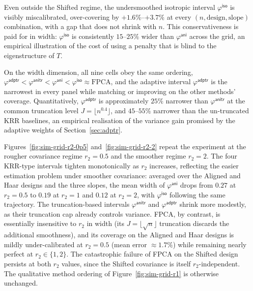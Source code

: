 \documentclass[11pt,a4paper]{article}
\theoremstyle{definition}
\theoremstyle{plain}
\theoremstyle{remark}
\newcommand{\iso}{\mathsf{iso}}
\newcommand{\ani}{\mathsf{ani}}
\newcommand{\anitr}{\mathsf{anitr}}
\newcommand{\adptr}{\mathsf{adptr}}
\begin{document}
Even outside the Shifted regime, the undersmoothed isotropic interval $\varphi^{\iso}$ is visibly miscalibrated, over-covering by $+1.6\%$--$+3.7\%$ at every $(n,\text{design},\text{slope})$ combination, with a gap that does not shrink with $n$. This conservativeness is paid for in width: $\varphi^{\iso}$ is consistently $15$--$25\%$ wider than $\varphi^{\ani}$ across the grid, an empirical illustration of the cost of using a penalty that is blind to the eigenstructure of $T$.

On the width dimension, all nine cells obey the same ordering, $\varphi^{\adptr}<\varphi^{\anitr}<\varphi^{\ani}<\varphi^{\iso}\approx\text{FPCA}$, and the adaptive interval $\varphi^{\adptr}$ is the narrowest in every panel while matching or improving on the other methods' coverage. Quantitatively, $\varphi^{\adptr}$ is approximately $25\%$ narrower than $\varphi^{\anitr}$ at the common truncation level $J=\lfloor n^{0.4}\rfloor$, and $45$--$55\%$ narrower than the un-truncated KRR baselines, an empirical realisation of the variance gain promised by the adaptive weights of Section~\ref{sec:adptr}.

Figures~\ref{fig:sim-grid-r2-0p5} and~\ref{fig:sim-grid-r2-2} repeat the experiment at the rougher covariance regime $r_2=0.5$ and the smoother regime $r_2=2$. The four KRR-type intervals tighten monotonically as $r_2$ increases, reflecting the easier estimation problem under smoother covariance: averaged over the Aligned and Haar designs and the three slopes, the mean width of $\varphi^{\ani}$ drops from $0.27$ at $r_2=0.5$ to $0.19$ at $r_2=1$ and $0.12$ at $r_2=2$, with $\varphi^{\iso}$ following the same trajectory. The truncation-based intervals $\varphi^{\anitr}$ and $\varphi^{\adptr}$ shrink more modestly, as their truncation cap already controls variance. FPCA, by contrast, is essentially insensitive to $r_2$ in width (its $J=\lfloor\sqrt n\rfloor$ truncation discards the additional smoothness), and its coverage on the Aligned and Haar designs is mildly under-calibrated at $r_2=0.5$ (mean error $\approx 1.7\%$) while remaining nearly perfect at $r_2\in\{1,2\}$. The catastrophic failure of FPCA on the Shifted design persists at both $r_2$ values, since the Shifted covariance is itself $r_2$-independent. The qualitative method ordering of Figure~\ref{fig:sim-grid-r1} is otherwise unchanged.
\end{document}
